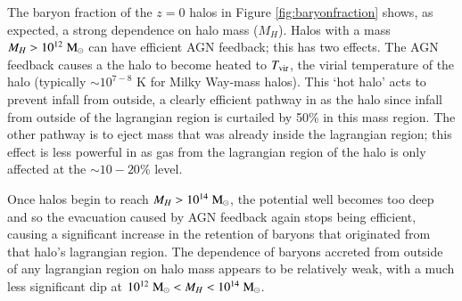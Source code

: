 The baryon fraction of the $z=0$ halos in Figure \ref{fig:baryonfraction}
shows, as expected, a strong dependence on halo mass ($M_H$). Halos with a
mass  $M_H > 10^{12} \;{\rm M}_{\odot}{}$ can have efficient AGN feedback; this has two
effects. The AGN feedback causes a the halo to become heated to $T_{\rm
vir}$, the virial temperature of the halo (typically $\sim10^{7-8}$ K for Milky
Way-mass halos). This `hot halo' acts to prevent infall from outside, a
clearly efficient pathway in \simba{} as the halo since infall from outside of
the lagrangian region is curtailed by 50\% in this mass region.  The other
pathway is to eject mass that was already inside the lagrangian region; this
effect is less powerful in \simba{} as gas from the lagrangian region of the
halo is only affected at the $\sim10-20\%$ level.

Once halos begin to reach $M_H > 10^{14} \;{\rm M}_{\odot}{}$, the potential well
becomes too deep and so the evacuation caused by AGN feedback again stops
being efficient, causing a significant increase in the retention of baryons
that originated from that halo's lagrangian region. The dependence of baryons
accreted from outside of any lagrangian region on halo mass appears to be
relatively weak, with a much less significant dip at $10^{12} \;{\rm M}_{\odot}{} < M_H
< 10^{14} \;{\rm M}_{\odot}{}$.
